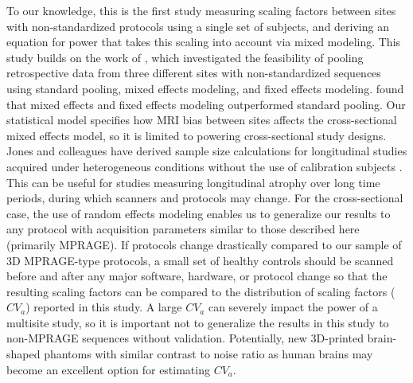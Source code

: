 To our knowledge, this is the first study measuring scaling factors between sites with non-standardized protocols using a single set of subjects, and deriving an equation for power that takes this scaling into account via mixed modeling. This study builds on the work of \cite{fennema2007feasibility}, which investigated the feasibility of pooling retrospective data from three different sites with non-standardized sequences using standard pooling, mixed effects modeling, and fixed effects modeling. \cite{fennema2007feasibility} found that mixed effects and fixed effects modeling outperformed standard pooling. Our statistical model specifies how MRI bias between sites affects the cross-sectional mixed effects model, so it is limited to powering cross-sectional study designs. Jones and colleagues have derived sample size calculations for longitudinal studies acquired under heterogeneous conditions without the use of calibration subjects \cite{jones2013quantification}. This can be useful for studies measuring longitudinal atrophy over long time periods, during which scanners and protocols may change. For the cross-sectional case, the use of random effects modeling enables us to generalize our results to any protocol with acquisition parameters similar to those described here (primarily MPRAGE). If protocols change drastically compared to our sample of 3D MPRAGE-type protocols, a small set of healthy controls should be scanned before and after any major software, hardware, or protocol change so that the resulting scaling factors can be compared to the distribution of scaling factors ($CV_a$) reported in this study. A large $CV_a$ can severely impact the power of a multisite study, so it is important not to generalize the results in this study to non-MPRAGE sequences without validation. Potentially, new 3D-printed brain-shaped phantoms with similar contrast to noise ratio as human brains may become an excellent option for estimating $CV_a$.